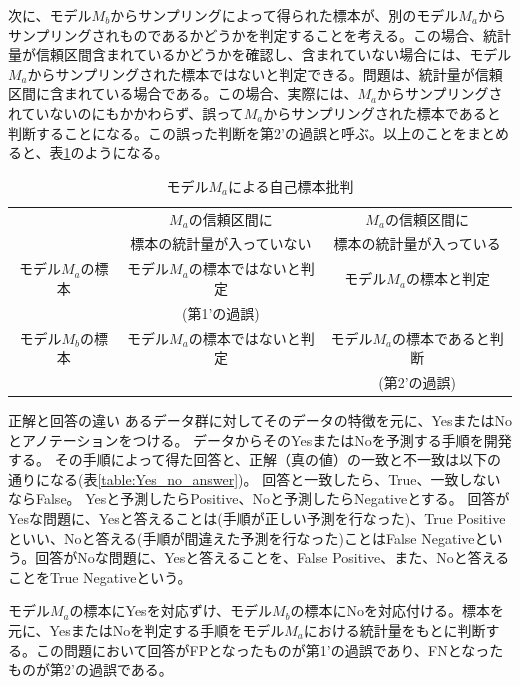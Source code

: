 次に、モデル$M_b$からサンプリングによって得られた標本が、別のモデル$M_a$からサンプリングされものであるかどうかを判定することを考える。この場合、統計量が信頼区間含まれているかどうかを確認し、含まれていない場合には、モデル$M_a$からサンプリングされた標本ではないと判定できる。問題は、統計量が信頼区間に含まれている場合である。この場合、実際には、$M_a$からサンプリングされていないのにもかかわらず、誤って$M_a$からサンプリングされた標本であると判断することになる。この誤った判断を第2'の過誤と呼ぶ。以上のことをまとめると、表\ref{table:type_error}のようになる。

\begin{table}[hbtp]
 \caption{モデル$M_a$による自己標本批判}
 \label{table:type_error}
 \centering
 \begin{tabular}{ccc}
  \hline
  &  $M_a$の信頼区間に &  $M_a$の信頼区間に \\
  & 標本の統計量が入っていない & 標本の統計量が入っている \\
  \hline \hline
  モデル$M_a$の標本  & モデル$M_a$の標本ではないと判定  & モデル$M_a$の標本と判定 \\
  & (第1'の過誤) & \\
  モデル$M_b$の標本  & モデル$M_a$の標本ではないと判定  & モデル$M_a$の標本であると判断 \\
  & & (第2'の過誤) \\
  \hline
 \end{tabular}
\end{table}


\begin{SMbox}{正解と回答の違い}
 あるデータ群に対してそのデータの特徴を元に、YesまたはNoとアノテーションをつける。
 データからそのYesまたはNoを予測する手順を開発する。
 その手順によって得た回答と、正解（真の値）の一致と不一致は以下の通りになる(表\ref{table:Yes_no_answer})。
 回答と一致したら、True、一致しないならFalse。
 Yesと予測したらPositive、Noと予測したらNegativeとする。
 回答がYesな問題に、Yesと答えることは(手順が正しい予測を行なった)、True Positiveといい、Noと答える(手順が間違えた予測を行なった)ことはFalse Negativeという。回答がNoな問題に、Yesと答えることを、False Positive、また、Noと答えることをTrue Negativeという。

 モデル$M_a$の標本にYesを対応ずけ、モデル$M_b$の標本にNoを対応付ける。標本を元に、YesまたはNoを判定する手順をモデル$M_a$における統計量をもとに判断する。この問題において回答がFPとなったものが第1'の過誤であり、FNとなったものが第2'の過誤である。
\end{SMbox}

